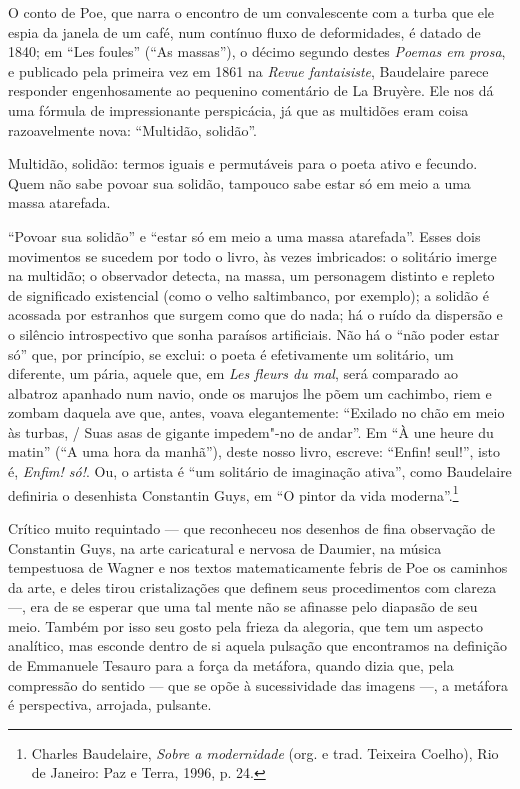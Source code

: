 O conto de Poe, que narra o encontro de um convalescente com a turba que
ele espia da janela de um café, num contínuo fluxo de deformidades, é
datado de 1840; em “Les foules” (“As massas”), o décimo segundo destes
\textit{Poemas em prosa}, e publicado pela primeira vez em 1861 na
\textit{Revue fantaisiste}, Baudelaire parece responder engenhosamente
ao pequenino comentário de La Bruyère. Ele nos dá uma fórmula de
impressionante perspicácia, já que as multidões eram coisa
razoavelmente nova: “Multidão, solidão”. 

\begin{hedraquote}
Multidão, solidão: termos iguais e permutáveis para o poeta ativo e
fecundo. Quem não sabe povoar sua solidão, tampouco sabe estar só em
meio a uma massa atarefada.
\end{hedraquote}

“Povoar sua solidão” e “estar só em meio a uma massa atarefada”. Esses
dois movimentos se sucedem por todo o livro, às vezes imbricados: o
solitário imerge na multidão; o observador detecta, na massa, um
personagem distinto e repleto de significado existencial (como o velho
saltimbanco, por exemplo); a solidão é acossada por estranhos que
surgem como que do nada; há o ruído da dispersão e o silêncio
introspectivo que sonha paraísos artificiais. Não há o “não poder estar
só” que, por princípio, se exclui: o poeta é efetivamente um solitário,
um diferente, um pária, aquele que, em \textit{Les fleurs du mal}, será
comparado ao albatroz apanhado num navio, onde os marujos lhe põem um
cachimbo, riem e zombam daquela ave que, antes, voava elegantemente:
“Exilado no chão em meio às turbas, / Suas asas de gigante impedem"-no
de andar”. Em “À une heure du matin” (“A uma hora da manhã”), deste
nosso livro, escreve: “Enfin! seul!”, isto é, \textit{Enfim! só!}. Ou,
o artista é “um solitário de imaginação ativa”, como Baudelaire
definiria o desenhista Constantin Guys, em “O pintor da vida
moderna”.\footnote{ Charles Baudelaire, \textit{Sobre a modernidade}
(org. e trad. Teixeira Coelho), Rio de Janeiro: Paz e
Terra, 1996, p. 24.}

Crítico muito requintado --- que reconheceu nos desenhos de fina
observação de Constantin Guys, na arte caricatural e nervosa de
Daumier, na música tempestuosa de Wagner e nos textos matematicamente
febris de Poe os caminhos da arte, e deles tirou cristalizações que
definem seus procedimentos com clareza ---, era de se esperar que uma tal
mente não se afinasse pelo diapasão de seu meio. Também por isso seu
gosto pela frieza da alegoria, que tem um aspecto analítico, mas
esconde dentro de si aquela pulsação que encontramos na definição de
Emmanuele Tesauro para a força da metáfora, quando dizia que, pela
compressão do sentido --- que se opõe à sucessividade das imagens ---, a
metáfora é perspectiva, arrojada, pulsante.

